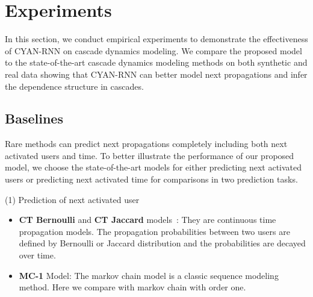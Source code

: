 \section{Experiments}
\label{sec:exp}
In this section, we conduct empirical experiments to demonstrate the
effectiveness of CYAN-RNN on cascade dynamics modeling. We compare the proposed
model to the state-of-the-art cascade dynamics modeling methods on both
synthetic and real data showing that CYAN-RNN can better model next
propagations and infer the dependence structure in cascades.

\subsection{Baselines}

Rare methods can predict next propagations completely including both next
activated users and time. To better illustrate the performance of our
proposed model, we choose the state-of-the-art models for either predicting
next activated users or predicting next activated time for comparisons in two
prediction tasks.

(1) Prediction of next activated user
\begin{itemize}
  \item \textbf{CT Bernoulli} and \textbf{CT Jaccard}
  models~\cite{goyal2010learning}: They are continuous time propagation models.
  The propagation probabilities between two users are defined by Bernoulli or
  Jaccard distribution and the probabilities are decayed over time.
  \item \textbf{MC-1} Model: The markov chain model is a classic sequence
  modeling method. Here we compare with markov chain with order one.
\end{itemize}

